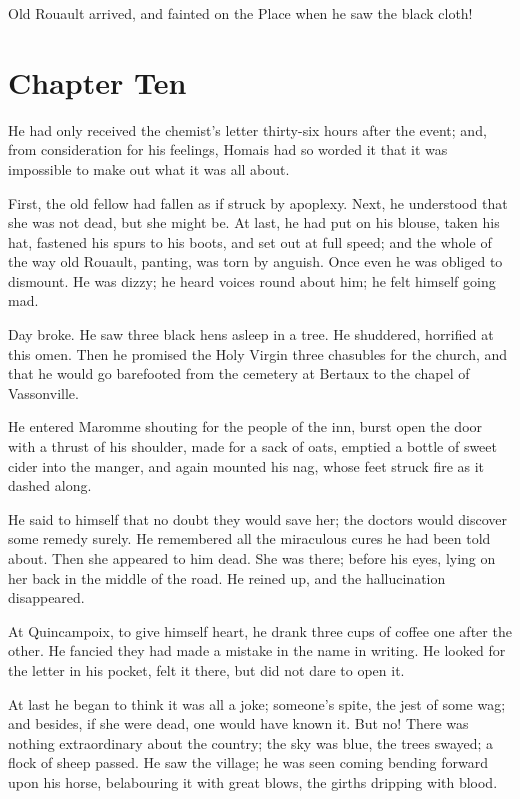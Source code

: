 \documentclass{tufte-book}
\begin{document}
Old Rouault arrived, and fainted on the Place when he saw the black
cloth!



\chapter{Chapter Ten}

He had only received the chemist's letter thirty-six hours after the
event; and, from consideration for his feelings, Homais had so worded it
that it was impossible to make out what it was all about.

First, the old fellow had fallen as if struck by apoplexy. Next, he
understood that she was not dead, but she might be. At last, he had put
on his blouse, taken his hat, fastened his spurs to his boots, and set
out at full speed; and the whole of the way old Rouault, panting, was
torn by anguish. Once even he was obliged to dismount. He was dizzy; he
heard voices round about him; he felt himself going mad.

Day broke. He saw three black hens asleep in a tree. He shuddered,
horrified at this omen. Then he promised the Holy Virgin three chasubles
for the church, and that he would go barefooted from the cemetery at
Bertaux to the chapel of Vassonville.

He entered Maromme shouting for the people of the inn, burst open the
door with a thrust of his shoulder, made for a sack of oats, emptied a
bottle of sweet cider into the manger, and again mounted his nag, whose
feet struck fire as it dashed along.

He said to himself that no doubt they would save her; the doctors would
discover some remedy surely. He remembered all the miraculous cures
he had been told about. Then she appeared to him dead. She was there;
before his eyes, lying on her back in the middle of the road. He reined
up, and the hallucination disappeared.

At Quincampoix, to give himself heart, he drank three cups of coffee
one after the other. He fancied they had made a mistake in the name in
writing. He looked for the letter in his pocket, felt it there, but did
not dare to open it.

At last he began to think it was all a joke; someone's spite, the jest
of some wag; and besides, if she were dead, one would have known it. But
no! There was nothing extraordinary about the country; the sky was blue,
the trees swayed; a flock of sheep passed. He saw the village; he was
seen coming bending forward upon his horse, belabouring it with great
blows, the girths dripping with blood.
\end{document}
